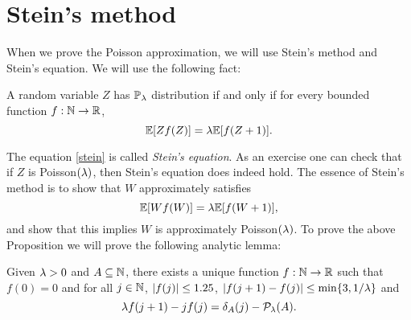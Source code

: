\section{Stein's method}
When we prove the Poisson approximation, we will use Stein's method and Stein's equation. We will use the following fact:
\begin{prop}
    A random variable $Z$ has ${\mathbb{P}}_\lambda$ distribution if and only if for every bounded function $f:{{\mathbb N}} \to {\mathbb R}$, 
    \begin{equation}
        \label{stein} {\mathbb{E}}[Zf(Z)] = \lambda {\mathbb{E}}[f(Z+1)].
    \end{equation}
\end{prop}
The equation \eqref{stein} is called \emph{Stein's equation}. As an exercise one can check that if $Z$ is Poisson$(\lambda)$, then Stein's equation does indeed hold. The essence of Stein's method is to show that $W$ approximately satisfies 
\[{\mathbb{E}}[Wf(W)]  = \lambda {\mathbb{E}}[f(W+1)],\]
and show that this implies $W$ is approximately Poisson$(\lambda)$. To prove the above Proposition we will prove the following analytic lemma:
\begin{lemma}
    Given $\lambda > 0$ and $A \subseteq {{\mathbb N}}$, there exists a unique function $f: {{\mathbb N}} \to {\mathbb R}$ such that $f(0)=0$ and for all $j \in {{\mathbb N}}$, ${\left\lvert f(j)\right\rvert}\le 1.25$, ${\left\lvert f(j+1)-f(j)\right\rvert} \le \min\{3,1/\lambda\}$ and
    \[\lambda f(j+1)-jf(j) = \delta_A(j)-{\mathcal{P}}_\lambda(A).\]
\end{lemma}
